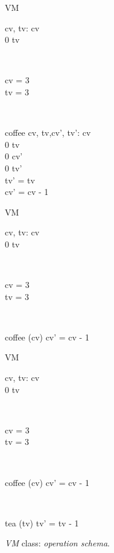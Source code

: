 \begin{figure}[H]
\centering
\begin{sidebyside}[3]
\begin{class}{VM}
\\
\begin{state}
cv, tv: \integer
{} \leq  cv 
\\
0 \leq  tv 
\end{state} 
\\
\begin{init}
cv = 3
\\tv = 3
\end{init} 
\\
\begin{op}{coffee}
cv, tv,cv', tv': \integer
{} \leq  cv 
\\
0 \leq  tv 
\\
0 \leq  cv' 
\\
0 \leq  tv' 
\\
tv' = tv
\\
cv' = cv - 1
\end{op}
\end{class}
\nextside
\begin{class}{VM}
\\
\begin{state}
cv, tv: \integer
{} \leq  cv 
\\
0 \leq  tv 
\end{state} 
\\
\begin{init}
cv = 3
\\tv = 3
\end{init} 
\\
\begin{op}{coffee}
\Delta (cv)
\ST
cv' = cv - 1
\end{op}
\end{class}
\nextside
\begin{class}{VM}
\\
\begin{state}
cv, tv: \integer
{} \leq  cv 
\\
0 \leq  tv 
\end{state} 
\\
\begin{init}
cv = 3
\\tv = 3
\end{init} 
\\
\begin{op}{coffee}
\Delta (cv)
\ST
cv' = cv - 1
\end{op}
\\
\begin{op}{tea}
\Delta (tv)
\ST
tv' = tv - 1
\end{op}
\end{class}
\end{sidebyside}
\caption{\textit{VM} class: \textit{operation schema}.}
\label{fig_oz_vm_operation_schema}
\end{figure}
